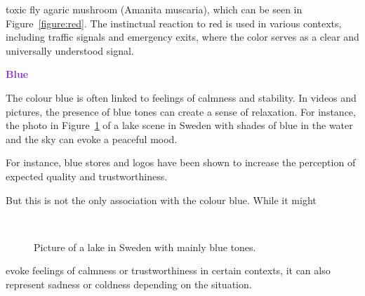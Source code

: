 \documentclass[../MasterThesis.tex]{subfiles}
\begin{document}
\vspace*{-0.6em}
toxic fly agaric mushroom (Amanita muscaria), which can be seen in Figure~\ref{figure:red}.
The instinctual reaction to red is used in various contexts, including traffic signals and emergency exits, where the color serves as a clear and universally understood signal.







\newpage
\textbf{\textcolor{BlueViolet}{Blue}}

%
\begin{minipage}{0.45\textwidth}
	The colour blue is often linked to feelings of calmness and stability. In videos and pictures, the presence of blue tones can create a sense of relaxation. For instance, the photo in Figure~\ref{figure:blue} of a lake scene in Sweden with shades of blue in the water and the sky can evoke a peaceful mood.
	
	For instance, blue stores and logos have been shown to increase the perception of expected quality and trustworthiness.~\cite{blue_trust, colour2}
	
	But this is not the only association with the colour blue. While it might
	
	
	
\end{minipage}\begin{minipage}{0.05\textwidth}
	\ 
\end{minipage}\begin{minipage}{0.5\textwidth}
	\begin{figure}[H]
		\begin{center}
			\caption[Picture of a lake in Sweden with mainly blue tones.]{Picture of a lake in Sweden with mainly blue tones.}
			\label{figure:blue}
		\end{center}
	\end{figure}\hfill
\end{minipage}

\vspace*{-0.6em}
evoke feelings of calmness or trustworthiness in certain contexts, it can also represent sadness or coldness depending on the situation.~\cite{colour2}
\end{document}
